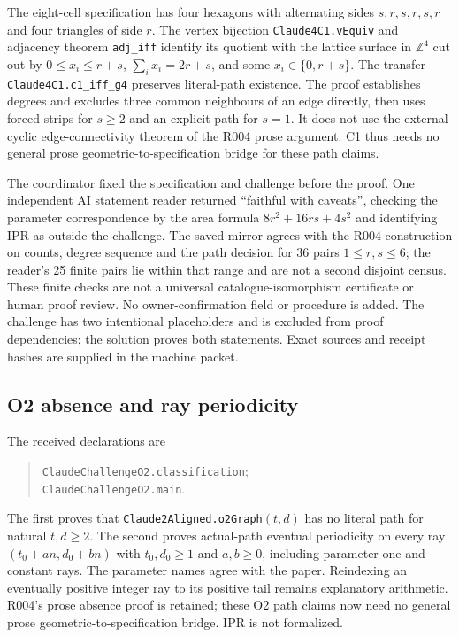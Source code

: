 \documentclass[11pt]{amsart}
\newcommand{\record}[1]{\nolinkurl{#1}}
\theoremstyle{definition}\newtheorem{definition}{Definition}
\begin{document}
The eight-cell specification has four hexagons with alternating sides
$s,r,s,r,s,r$ and four triangles of side $r$. The vertex bijection
\record{Claude4C1.vEquiv} and adjacency theorem \record{adj_iff} identify
its quotient with the lattice surface in $\mathbb Z^4$ cut out by
$0\le x_i\le r+s$, $\sum_i x_i=2r+s$, and some $x_i\in\{0,r+s\}$.
The transfer \record{Claude4C1.c1_iff_g4} preserves literal-path
existence. The proof establishes degrees and excludes three common
neighbours of an edge directly, then uses forced strips for $s\ge2$
and an explicit path for $s=1$. It does not use the external cyclic
edge-connectivity theorem of the R004 prose argument. C1 thus needs
no general prose geometric-to-specification bridge for these path claims.

The coordinator fixed the specification and challenge before the proof.
One independent AI statement reader returned ``faithful with caveats'',
checking the parameter correspondence by the area formula
$8r^2+16rs+4s^2$ and identifying IPR as outside the challenge.
The saved mirror agrees with the R004 construction on counts, degree
sequence and the path decision for 36 pairs $1\le r,s\le6$; the reader's
25 finite pairs lie within that range and are not a second disjoint census.
These finite checks are not a universal catalogue-isomorphism certificate
or human proof review. No owner-confirmation field or procedure is added.
The challenge has two intentional placeholders and is excluded from proof
dependencies; the solution proves both statements. Exact sources and
receipt hashes are supplied in the machine packet.

\subsection{O2 absence and ray periodicity}\label{sec:o2-formal}
The received declarations are
\begin{quote}\small\noindent
\record{ClaudeChallengeO2.classification};\\
\record{ClaudeChallengeO2.main}.
\end{quote}
The first proves that \record{Claude2Aligned.o2Graph}$(t,d)$ has no literal
path for natural $t,d\ge2$. The second proves actual-path eventual
periodicity on every ray $(t_0+an,d_0+bn)$ with $t_0,d_0\ge1$ and
$a,b\ge0$, including parameter-one and constant rays. The parameter
names agree with the paper. Reindexing an eventually positive integer
ray to its positive tail remains explanatory arithmetic. R004's prose
absence proof is retained; these O2 path claims now need no general
prose geometric-to-specification bridge. IPR is not formalized.
\end{document}
